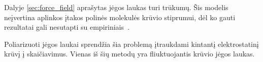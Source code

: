 Dalyje \ref{sec:force_field} aprašytas jėgos laukas turi trūkumų.
Šis modelis neįvertina aplinkos įtakos polinės molekulės krūvio stiprumui, dėl ko gauti rezultatai gali nesutapti su empiriniais~\cite{polar}.

Poliarizuoti jėgos laukai sprendžia šia problemą įtraukdami kintantį elektrostatinį krūvį į skaičiavimus.
Vienas iš šių metodų yra fliuktuojantis krūvio jėgos laukas.

